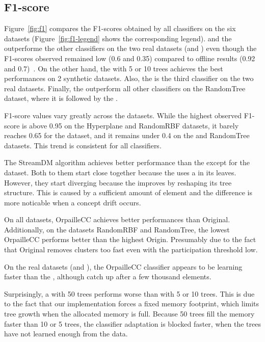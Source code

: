 \subsection{F1-score}
Figure~\ref{fig:f1} compares the F1-scores obtained by all classifiers on the
six datasets (Figure~\ref{fig:f1-legend} shows the corresponding legend).
\naivebayes and the \hoeffdingtree outperforme the other classifiers on the two
real datasets (\banosdataset and \recofitdataset) even though the F1-scores
observed remained low (0.6 and 0.35) compared to offline results (0.92 and
0.7)~\cite{behzad2019}.  On the other hand, the \mondrianforest with 5 or 10
trees achieves the best performances on 2 synthetic datasets.  Also, the
\mondrianforest is the third classifier on the two real datasets.  Finally, the
\hoeffdingtree outperform all other classifiers on the RandomTree dataset,
where it is followed by the \mondrianforest.

F1-score values vary greatly across the datasets.  While the highest
observed F1-score is above 0.95 on the Hyperplane and RandomRBF datasets,
it barely reaches 0.65 for the \banosdataset dataset, and it remains under
0.4 on the \recofitdataset and RandomTree datasets. This trend is
consistent for all classifiers.

The StreamDM \hoeffdingtree algorithm achieves better performance than the
\naivebayes except for the \banosdataset dataset.  Both to them start close
together because the \hoeffdingtree uses a \naivebayes in its leaves.  However,
they start diverging because the \hoeffdingtree improves by reshaping its tree
structure.  This is caused by a sufficient amount of element and the difference
is more noticable when a concept drift occurs.

On all datasets, \mcnn OrpailleCC achieves better performances than \mcnn
Original. Additionally, on the datasets RandomRBF and RandomTree, the lowest
\mcnn OrpailleCC performs better than the highest \mcnn Origin. Presumably due
to the fact that \mcnn Original removes clusters too fast even with the
participation threshold low.

On the real datasets (\banosdataset and \recofitdataset), the \mcnn OrpailleCC
classifier appears to be learning faster than the \mondrianforest, although
\mondrianforest catch up after a few thousand elements. 

Surprisingly, a \mondrianforest with 50 trees performs worse than with 5 or 10
trees. This is due to the fact that our \mondrianforest implementation forces a
fixed memory footprint, which limits tree growth when the allocated memory is
full. Because 50 trees fill the memory faster than 10 or 5 trees, the
classifier adaptation is blocked faster, when the trees have not learned enough
from the data.

